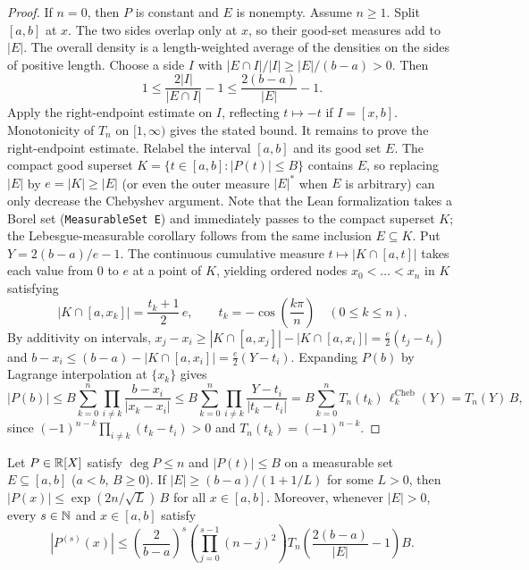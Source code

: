 \begin{proof}
If $n=0$, then $P$ is constant and $E$ is nonempty. Assume $n\ge1$.
Split $[a,b]$ at $x$. The two sides overlap only at $x$, so their good-set measures add to $|E|$.
The overall density is a length-weighted average of the densities on the sides of positive length.
Choose a side $I$ with $|E\cap I|/|I|\ge |E|/(b-a)>0$. Then
\[
  1\le \frac{2|I|}{|E\cap I|}-1\le \frac{2(b-a)}{|E|}-1.
\]
Apply the right-endpoint estimate on $I$, reflecting $t\mapsto -t$ if $I=[x,b]$.
Monotonicity of $T_n$ on $[1,\infty)$ gives the stated bound.
It remains to prove the right-endpoint estimate. Relabel the interval $[a,b]$ and its good set $E$.
The compact good superset $K=\{t\in[a,b]:|P(t)|\le B\}$ contains $E$, so replacing $|E|$ by $e=|K| \ge |E|$ (or even the outer measure $|E|^*$ when $E$ is arbitrary) can only decrease the Chebyshev argument. Note that the Lean formalization takes a Borel set (\texttt{MeasurableSet E}) and immediately passes to the compact superset $K$; the Lebesgue-measurable corollary follows from the same inclusion $E \subseteq K$.
Put $Y=2(b-a)/e-1$. The continuous cumulative measure $t\mapsto |K\cap[a,t]|$ takes each value from $0$ to $e$ at a point of $K$, yielding ordered nodes $x_0<\dots<x_n$ in $K$ satisfying
\[
|K \cap [a, x_k]| = \frac{t_k + 1}{2}\,e, \qquad t_k = -\cos\!\left(\frac{k\pi}{n}\right) \quad (0 \le k \le n).
\]
By additivity on intervals, $x_j - x_i \ge |K \cap [a, x_j]| - |K \cap [a, x_i]| = \frac{e}{2}(t_j - t_i)$ and $b - x_i \le (b - a) - |K \cap [a, x_i]| = \frac{e}{2}(Y - t_i)$. Expanding $P(b)$ by Lagrange interpolation at $\{x_k\}$ gives
\[
|P(b)| \le B \sum_{k=0}^n \prod_{i \ne k} \frac{b - x_i}{|x_k - x_i|}
\le B \sum_{k=0}^n \prod_{i \ne k} \frac{Y - t_i}{|t_k - t_i|}
= B \sum_{k=0}^n T_n(t_k)\,\ell_k^{\mathrm{Cheb}}(Y)
= T_n(Y)\,B,
\]
since $(-1)^{n-k}\prod_{i \ne k}(t_k - t_i) > 0$ and $T_n(t_k) = (-1)^{n-k}$.
\end{proof}

\begin{theorem}
\label{thm:remez-exp-markov}
\leanok
Let $P \in \mathbb{R}[X]$ satisfy $\deg P \le n$ and $|P(t)| \le B$ on a measurable set $E \subseteq [a, b]$ ($a < b$, $B \ge 0$). If $|E| \ge (b - a)/(1 + 1/L)$ for some $L > 0$, then $|P(x)| \le \exp(2n/\sqrt{L})\,B$ for all $x \in [a, b]$. Moreover, whenever $|E| > 0$, every $s \in \mathbb{N}$ and $x \in [a, b]$ satisfy
\[
|P^{(s)}(x)| \le \left(\frac{2}{b - a}\right)^s \left(\prod_{j=0}^{s-1}(n - j)^2\right) T_n\!\left(\frac{2(b - a)}{|E|} - 1\right) B.
\]
\end{theorem}

